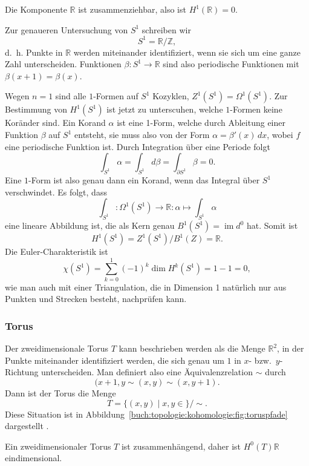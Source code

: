 Die Komponente $\mathbb{R}$ ist zusammenziehbar, also ist $H^1(\mathbb{R})=0$.

Zur genaueren Untersuchung von $S^1$ schreiben wir 
\[
S^1
=
\mathbb{R}/\mathbb{Z},
\]
d.~h. Punkte in $\mathbb{R}$ werden miteinander identifiziert, wenn
sie sich um eine ganze Zahl unterscheiden.
Funktionen $\beta\colon S^1\to\mathbb{R}$ sind also periodische Funktionen 
mit $\beta(x+1)=\beta(x)$.

Wegen $n=1$ sind
alle $1$-Formen auf $S^1$ Kozyklen, $Z^1(S^1)=\Omega^1(S^1)$.
Zur Bestimmung von $H^1(S^1)$ ist jetzt zu unterscuhen,
welche $1$-Formen keine Koränder sind.
Ein Korand $\alpha$ ist eine 1-Form, welche durch Ableitung einer
Funktion $\beta$ auf $S^1$ entsteht, sie muss also von der Form
$\alpha=\beta'(x)\,dx$, wobei $f$ eine periodische Funktion ist.
Durch Integration über eine Periode folgt
\[
\int_{S^1} \alpha
=
\int_{S^1} d\beta
=
\int_{\partial S^1} \beta
=
0.
\]
Eine $1$-Form ist also genau dann ein Korand, wenn das Integral
über $S^1$ verschwindet.
Es folgt, dass
\[
\int_{S^1}
\colon
\Omega^1(S^1)\to \mathbb{R}
:
\alpha
\mapsto
\int_{S^1}\alpha
\]
eine lineare Abbildung ist, die als Kern genau
$B^1(S^1)=\operatorname{im}d^0$ hat.
Somit ist
\[
H^1(S^1)
=
Z^1(S^1) / B^1(Z)
=
\mathbb{R}.
\]
Die Euler-Charakteristik ist
\[
\chi(S^1)
=
\sum_{k=0}^1 (-1)^k\dim H^k(S^1)
=
1-1
=
0,
\]
wie man auch mit einer Triangulation, die in Dimension 1 natürlich nur
aus Punkten und Strecken besteht, nachprüfen kann.

%
%
\subsubsection{Torus}

Der zweidimensionale Torus $T$ kann beschrieben werden als die
Menge $\mathbb{R}^2$, in der Punkte miteinander identifiziert
werden, die sich genau um $1$ in $x$- bzw.~$y$-Richtung unterscheiden.
Man definiert also eine Äquivalenzrelation $\sim$ durch
\[
(x+1,y \sim (x,y) \sim (x,y+1).
\]
Dann ist der Torus die Menge
\[
T
=
\{ (x,y) \mid x,y\in\mathbb\}
/
\sim.
\]
Diese Situation ist in
Abbildung~\ref{buch:topologie:kohomologie:fig:toruspfade}
dargestellt .

Ein zweidimensionaler Torus $T$ ist zusammenhängend, daher ist
$H^0(T)\mathbb{R}$ eindimensional.


